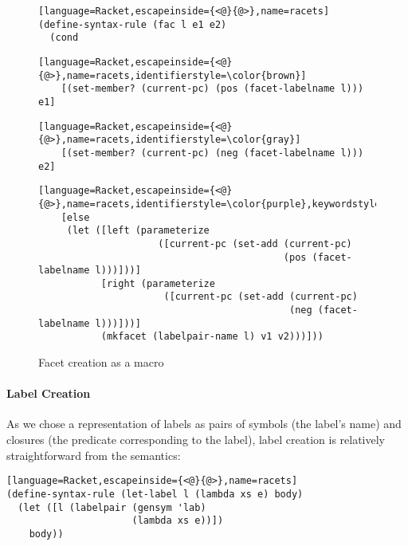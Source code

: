 \documentclass[review=true,acmlarge]{acmart}
\begin{document}
\begin{figure}
{\small
\begin{lstlisting}[language=Racket,escapeinside={<@}{@>},name=racets]
(define-syntax-rule (fac l e1 e2)
  (cond
\end{lstlisting}
\vspace{-.7\baselineskip}
{\color{brown}
\begin{lstlisting}[language=Racket,escapeinside={<@}{@>},name=racets,identifierstyle=\color{brown}]
    [(set-member? (current-pc) (pos (facet-labelname l))) e1]
\end{lstlisting}
}
\vspace{-.7\baselineskip}
{\color{gray}
\begin{lstlisting}[language=Racket,escapeinside={<@}{@>},name=racets,identifierstyle=\color{gray}]
    [(set-member? (current-pc) (neg (facet-labelname l))) e2]
\end{lstlisting}
}
\vspace{-.7\baselineskip}
{\small\color{purple}
\begin{lstlisting}[language=Racket,escapeinside={<@}{@>},name=racets,identifierstyle=\color{purple},keywordstyle=\color{purple}]
    [else
     (let ([left (parameterize
                     ([current-pc (set-add (current-pc)
                                           (pos (facet-labelname l)))]))]
           [right (parameterize
                      ([current-pc (set-add (current-pc)
                                            (neg (facet-labelname l)))]))]
           (mkfacet (labelpair-name l) v1 v2)))]))
\end{lstlisting}}
}
\caption{Facet creation as a macro}
\label{fig:fac-create}
\end{figure}

\paragraph*{Label Creation}

As we chose a representation of labels as pairs of symbols (the
label's name) and closures (the predicate corresponding to the label),
label creation is relatively straightforward from the semantics:

\begin{lstlisting}[language=Racket,escapeinside={<@}{@>},name=racets]
(define-syntax-rule (let-label l (lambda xs e) body)
  (let ([l (labelpair (gensym 'lab)
                      (lambda xs e))])
    body))
\end{lstlisting}
\end{document}
